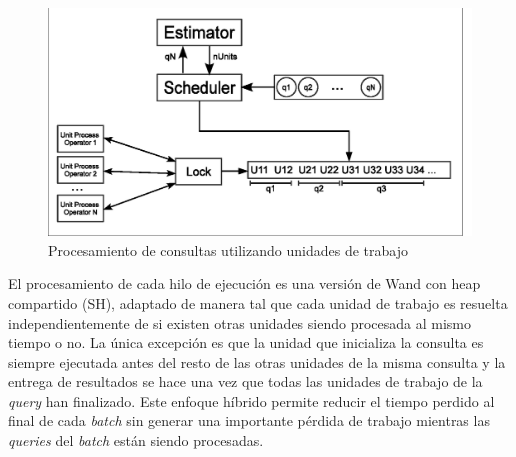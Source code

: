 \begin{figure}[H]
\centering
\includegraphics[scale=.75]{images/unit_process.eps}
\caption{Procesamiento de consultas utilizando unidades de trabajo}
\label{fig:unit_process}
\end{figure}

El procesamiento de cada hilo de ejecución es una versión de Wand con heap compartido (SH), adaptado de manera tal que cada unidad de trabajo es resuelta independientemente de si existen otras unidades siendo procesada al mismo tiempo o no. La única excepción es que la unidad que inicializa la consulta es siempre ejecutada antes del resto de las otras unidades de la misma consulta y la entrega de resultados se hace una vez que todas las unidades de trabajo de la \textit{query} han finalizado. Este enfoque híbrido permite reducir el tiempo perdido al final de cada \textit{batch} sin generar una importante pérdida de trabajo mientras las \textit{queries} del \textit{batch} están siendo procesadas.

